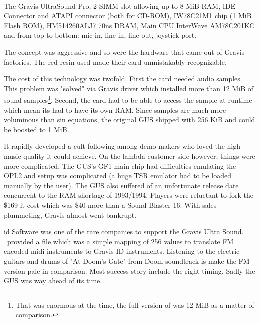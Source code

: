 \\
\par
The Gravis UltraSound Pro,  2 SIMM slot allowing up to 8 MiB RAM,  IDE Connector and  ATAPI connector (both for CD-ROM),  IW78C21M1 chip (1 MiB Flash ROM),  HM514260ALJ7 70ns DRAM,  Main CPU InterWave AM78C201KC and  from top to bottom: mic-in, line-in, line-out, joystick port.\\

The concept was aggressive and so were the hardware that came out of Gravis factories. The red resin used made their card unmistakably recognizable.\\
\par
The cost of this technology was twofold. First the card needed audio samples. This problem was "solved" via Gravis driver which installed more than 12 MiB of sound samples\footnote{That was enormous at the time, the full version of \doom was 12 MiB as a matter of comparison.}. Second, the card had to be able to access the sample at runtime which mean its had to have its own RAM. Since samples are much more voluminous than sin equations, the original GUS shipped with 256 KiB and could be boosted to 1 MiB.\\
\par
It rapidly developed a cult following among demo-makers who loved the high music quality it could achieve. On the lambda customer side however, things were more complicated. The GUS's GF1 main chip had difficulties emulating the OPL2 and setup was complicated (a huge TSR emulator had to be loaded manually by the user). The GUS also suffered of an unfortunate release date concurrent to the RAM shortage of 1993/1994. Players were reluctant to fork the \$169 it cost which was \$40 more than a Sound Blaster 16. With sales plummeting, Gravis almost went bankrupt.\\
\par
 id Software was one of the rare companies to support the Gravis Ultra Sound. \doom~provided a  file which was a simple mapping of 256 values to translate FM encoded midi  instruments to Gravis ID instruments. Listening to the electric guitars and drums of "At Doom's Gate" from Doom soundtrack is make the FM version pale in comparison. Most success story include the right timing. Sadly the GUS was way ahead of its time.